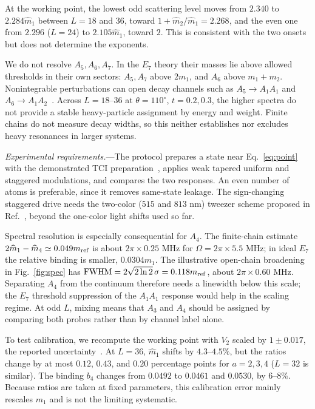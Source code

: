 \documentclass[aps,prl,twocolumn,superscriptaddress,showpacs,floatfix,10pt]{revtex4-2}
\begin{document}
At the working point, the lowest odd scattering level moves from $2.340$ to
$2.284\widehat m_1$ between $L=18$ and $36$, toward $1+\widehat m_2/\widehat m_1=2.268$,
and the even one from $2.296$ ($L=24$) to $2.105\widehat m_1$, toward $2$.
This is consistent with the two onsets but does not determine the exponents.

We do not resolve $A_5,A_6,A_7$. In the $E_7$ theory their masses lie above
allowed thresholds in their own sectors: $A_5,A_7$ above $2m_1$, and $A_6$ above
$m_1+m_2$. Nonintegrable perturbations can open decay channels such as
$A_5\to A_1A_1$ and $A_6\to A_1A_2$~\cite{Lepori2008}.
Across $L=18$--$36$ at $\theta=110^\circ$, $t=0.2,0.3$, the higher spectra do
not provide a stable heavy-particle assignment by energy and weight.
Finite chains do not measure decay widths, so this neither establishes nor
excludes heavy resonances in larger systems.

\emph{Experimental requirements.}---The protocol prepares a state near
Eq.~\eqref{eq:point} with the demonstrated TCI preparation~\cite{Sun2026}, applies
weak tapered uniform and staggered modulations, and compares the two responses.
An even number of atoms is preferable, since it removes same-state leakage.
The sign-changing staggered drive needs the two-color ($515$ and $813$ nm) tweezer
scheme proposed in Ref.~\cite{Sun2026}, beyond the one-color light shifts used so far.

Spectral resolution is especially consequential for $A_4$. The finite-chain
estimate $2\widehat m_1-\widehat m_4\simeq0.049m_{\rm ref}$ is about
$2\pi\times0.25$ MHz for $\Omega=2\pi\times5.5$ MHz; in ideal $E_7$ the relative
binding is smaller, $0.0304m_1$.
The illustrative open-chain broadening in Fig.~\ref{fig:spec} has
$\mathrm{FWHM}=2\sqrt{2\ln2}\,\sigma=0.118m_{\rm ref}$, about
$2\pi\times0.60$ MHz. Separating $A_4$ from the continuum therefore needs a linewidth below this
scale; the $E_7$ threshold suppression of the $A_1A_1$ response would help in the
scaling regime. At odd $L$, mixing means that $A_3$ and $A_4$ should be assigned
by comparing both probes rather than by channel label alone.

To test calibration, we recompute the working point with $V_2$ scaled by
$1\pm0.017$, the reported uncertainty~\cite{Sun2026}. At $L=36$,
$\widehat m_1$ shifts by $4.3$--$4.5\%$, but the ratios change by at most
$0.12$, $0.43$, and $0.20$ percentage points for $a=2,3,4$
($L=32$ is similar). The binding $b_4$ changes from $0.0492$ to
$0.0461$ and $0.0530$, by $6$--$8\%$. Because ratios are taken at fixed parameters,
this calibration error mainly rescales $m_1$ and is not the limiting systematic.
\end{document}
